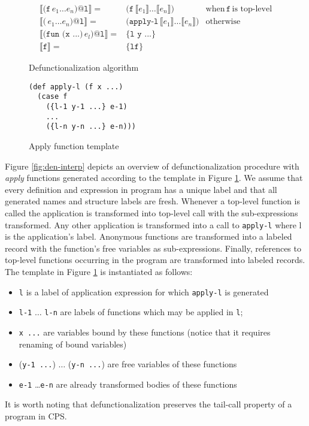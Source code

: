 \begin{figure}
    \centering
   \begin{align*}
        \llbracket \texttt{(f}\,e_1\ldots e_n\texttt{)@l} \rrbracket
        =& \texttt{(f}\,\llbracket e_1 \rrbracket \ldots \llbracket e_n \rrbracket \texttt{)}
         & \text{when}\,\texttt{f}\,\text{is top-level}\\
%
        \llbracket \texttt{(}\,e_1\ldots e_n\texttt{)@l} \rrbracket
        =& \texttt{(apply-l}\,\llbracket e_1 \rrbracket \ldots \llbracket e_n \rrbracket \texttt{)}
         & \text{otherwise}\\
%
        \llbracket \texttt{(fun (x ...)}\,e_l\texttt{)@l} \rrbracket
        =& \texttt{\{l y ...\}} & \\
%
        \llbracket \texttt{f} \rrbracket
        =& \texttt{\{lf\}} %
   \end{align*}
    \caption{Defunctionalization algorithm}
    \label{fig:den-interp}
    \begin{verbatim}
(def apply-l (f x ...)
  (case f
    ({l-1 y-1 ...} e-1)
    ...
    ({l-n y-n ...} e-n)))
   \end{verbatim}
   \caption{Apply function template}
    \label{fig:den-template}
\end{figure}

Figure \ref{fig:den-interp} depicts an overview of defunctionalization procedure with \textit{apply} functions generated according to the template in Figure \ref{fig:den-template}.
We assume that every definition and expression in program has a unique label and that all generated names and structure labels are fresh. 
Whenever a top-level function is called the application is transformed into top-level call with the sub-expressions transformed.
Any other application is transformed into a call to \texttt{apply-l} where l is the application's label.
Anonymous functions are transformed into a labeled record with the function's free variables as sub-expressions.
Finally, references to top-level functions occurring in the program are transformed into labeled records.
The template in Figure \ref{fig:den-template} is instantiated as follows:
\begin{itemize}
    \item \texttt{l} is a label of application expression for which \texttt{apply-l} is generated
    \item \texttt{l-1} $\ldots$ \texttt{l-n} are labels of functions which may be applied in \texttt{l};
    \item \texttt{x ...} are variables bound by these functions (notice that it requires renaming of bound variables)
    \item (\texttt{y-1 ...}) $\ldots$ (\texttt{y-n ...}) are free variables of these functions
    \item \texttt{e-1} \ldots \texttt{e-n} are already transformed bodies of these functions
\end{itemize}
It is worth noting that defunctionalization preserves the tail-call property of a program in CPS.

